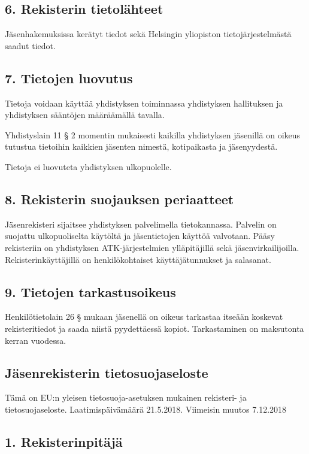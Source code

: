 \documentclass[finnish]{tktltiki}
\begin{document}
\subsection*{6. Rekisterin tietolähteet}
Jäsenhakemuksissa kerätyt tiedot sekä Helsingin yliopiston tietojärjestelmästä saadut tiedot.

\subsection*{7. Tietojen luovutus}
Tietoja voidaan käyttää yhdistyksen toiminnassa yhdistyksen hallituksen ja yhdistyksen sääntöjen määräämällä tavalla.

Yhdistyslain 11 § 2 momentin mukaisesti kaikilla yhdistyksen jäsenillä on oikeus tutustua tietoihin kaikkien jäsenten nimestä, kotipaikasta ja jäsenyydestä.

Tietoja ei luovuteta yhdistyksen ulkopuolelle.

\subsection*{8. Rekisterin suojauksen periaatteet}
Jäsenrekisteri sijaitsee yhdistyksen palvelimella tietokannassa. Palvelin on suojattu ulkopuoliselta käytöltä ja jäsentietojen käyttöä valvotaan. Pääsy rekisteriin on yhdistyksen ATK-järjestelmien ylläpitäjillä sekä jäsenvirkailijoilla. Rekisterinkäyttäjillä on henkilökohtaiset käyttäjätunnukset ja salasanat.

\subsection*{9. Tietojen tarkastusoikeus}
Henkilötietolain 26 § mukaan jäsenellä on oikeus tarkastaa itseään koskevat rekisteritiedot ja saada niistä pyydettäessä kopiot. Tarkastaminen on maksutonta kerran vuodessa.

\pagestyle{empty}


\subsection*{Jäsenrekisterin tietosuojaseloste}
Tämä on EU:n yleisen tietosuoja-asetuksen mukainen rekisteri- ja tietosuojaseloste.
Laatimispäivämäärä 21.5.2018. Viimeisin muutos 7.12.2018
\subsection*{1. Rekisterinpitäjä}
\end{document}
